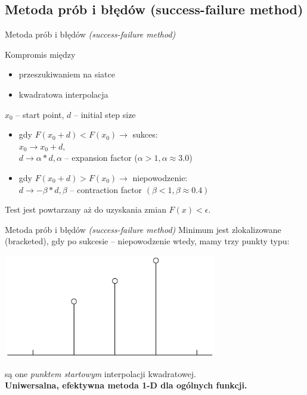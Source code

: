 \subsection{Metoda prób i błędów (success-failure method)}
  \begin{frame}{Metoda prób i błędów \emph{(success-failure method)}}
    \begin{block}{Kompromis między}
      \begin{itemize}
        \item przeszukiwaniem na siatce
        \item kwadratowa interpolacja
      \end{itemize}
    \end{block}
    $x_{0}$ -- start point, $d$ -- initial step size
    \begin{itemize}
      \item gdy $F(x_{0} + d) < F(x_{0}) \to$ sukces:\\
      $x_{0} \to x_{0} + d,$ \\
      $d \to \alpha * d, \alpha$ -- expansion factor %
      ($\alpha > 1, \alpha \approx 3.0$)
      \item gdy $F(x_{0} + d) > F(x_{0}) \to$ niepowodzenie: \\
      $d \to -\beta * d, \beta$ -- contraction factor
      $(\beta < 1, \beta \approx 0.4)$
    \end{itemize}
    Test jest powtarzany aż do uzyskania zmian $F(x) < \epsilon$.
  \end{frame}

  \begin{frame}{Metoda prób i błędów \emph{(success-failure method)}}
    Minimum jest zlokalizowane (bracketed), gdy po sukcesie
    -- niepowodzenie wtedy, mamy trzy punkty typu:\\ %
    \begin{center}
      \includegraphics[width=0.7\textwidth]{img/17/s-f}
    \end{center}
    są one \emph{punktem startowym} interpolacji kwadratowej.\\
    \textbf{Uniwersalna, efektywna metoda 1-D dla ogólnych funkcji.}
  \end{frame}
